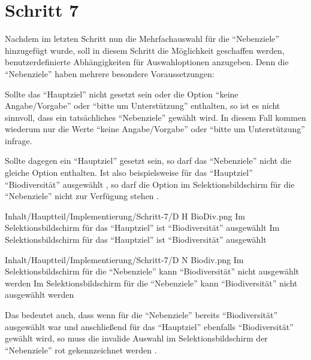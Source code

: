 \chapter{Schritt 7}
\label{chap:Schritt-7}


Nachdem im letzten Schritt nun die Mehrfachauswahl für die \enquote{Nebenziele} hinzugefügt wurde,
soll in diesem Schritt die Möglichkeit geschaffen werden,
benutzerdefinierte Abhängigkeiten für Auswahloptionen anzugeben.
Denn die \enquote{Nebenziele} haben mehrere besondere Voraussetzungen:

Sollte das \enquote{Hauptziel} nicht gesetzt sein oder die Option \enquote{keine Angabe/Vorgabe} oder \enquote{bitte um Unterstützung} enthalten,
so ist es nicht sinnvoll, dass ein tatsächliches \enquote{Nebenziele} gewählt wird.
In diesem Fall kommen wiederum nur die Werte \enquote{keine Angabe/Vorgabe} oder \enquote{bitte um Unterstützung} infrage.

Sollte dagegen ein \enquote{Hauptziel} gesetzt sein, so darf das \enquote{Nebenziele} nicht die gleiche Option enthalten.
Ist also beispielsweise für das \enquote{Hauptziel} \enquote{Biodiversität} ausgewählt \Abb{\ref{fig:Schritt4EingabemaskeDHBioDiv}},
so darf die Option im Selektionsbildschirm für die \enquote{Nebenziele} nicht zur Verfügung stehen \Abb{\ref{fig:Schritt4EingabemaskeDNBiodiv}}.

\begin{alexfigure}{Inhalt/Hauptteil/Implementierung/Schritt-7/D H BioDiv.png}
  {Im Selektionsbildschirm für das \enquote{Hauptziel} ist \enquote{Biodiversität} ausgewählt}
  {Im Selektionsbildschirm für das \enquote{Hauptziel} ist \enquote{Biodiversität} ausgewählt}

  \label{fig:Schritt4EingabemaskeDHBioDiv}

\end{alexfigure}

\begin{alexfigure}{Inhalt/Hauptteil/Implementierung/Schritt-7/D N Biodiv.png}
  {Im Selektionsbildschirm für die \enquote{Nebenziele} kann \enquote{Biodiversität} nicht ausgewählt werden}
  {Im Selektionsbildschirm für die \enquote{Nebenziele} kann \enquote{Biodiversität} nicht ausgewählt werden}

  \label{fig:Schritt4EingabemaskeDNBiodiv}

\end{alexfigure}


Das bedeutet auch,
dass wenn für die \enquote{Nebenziele} bereits \enquote{Biodiversität} ausgewählt war
und anschließend für das \enquote{Hauptziel} ebenfalls \enquote{Biodiversität} gewählt wird,
so muss die invalide Auswahl im Selektionsbildschirm der \enquote{Nebenziele} rot gekennzeichnet werden \Abb{\ref{fig:Schritt4EingabemaskeDNBiodivRot}}. 

